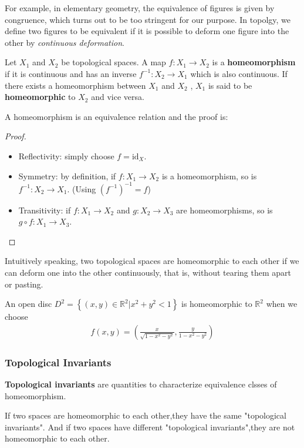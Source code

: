 \documentclass[10pt]{article}
\begin{document}
For example, in elementary geometry, the equivalence of figures is given by congruence, which turns out to be too stringent for our purpose.
In topolgy, we define two figures to be equivalent if it is possible to deform one figure into the other by \textit{continuous deformation}.
\begin{definition}[Homeomorphism]\label{homeomorphism}
    Let $X_1$ and $X_2$ be topological spaces.
    A map $f : X_{1}\to X_{2}$ is a \textbf{homeomorphism} if it is continuous and has an inverse $f^{-1}:X_{2}\to X_{1}$ which is also continuous.
    If there exists a homeomorphism between $X_1$ and $X_2$ , $X_1$ is said to be \textbf{homeomorphic} to $X_2$ and vice versa.
\end{definition}

A homeomorphism is an equivalence relation and the proof is:
\begin{proof}
    \begin{itemize}
        \item Reflectivity: simply choose $f=\text{id}_X$.
        \item Symmetry: by definition, if $f : X_1 \to X_2$ is a homeomorphism, so is $f^{-1} : X_2 \to X_1$. (Using $(f^{-1})^{-1}=f$)
        \item Transitivity: if $f : X_1 \to X_2$ and $g : X_2 \to X_3$ are homeomorphisms, so is $g\circ f : X_1\rightarrow X_3$.
    \end{itemize}
\end{proof}

Intuitively speaking, two topological spaces are homeomorphic to each other if we can deform one into the other continuously, that is, without tearing them apart or pasting.
\begin{example}
    An open disc $D^2= \left\{ (x,y)\in\mathbb{R}^{2}|x^2+y^2<1 \right\}$ is homeomorphic to $\mathbb{R}^2$ when we choose
    \begin{align}
        f(x,y)=\left(\frac{x}{\sqrt{1-x^2-y^2}},\frac{y}{1-x^2-y^2}\right)
    \end{align}
\end{example}

\subsubsection{Topological Invariants}
\textbf{Topological invariants} are quantities to characterize equivalence clsses of homeomorphism.

If two spaces are homeomorphic to each other,they have the same "topological invariants".
And if two spaces have different "topological invariants",they are not homeomorphic to each other.
\end{document}
